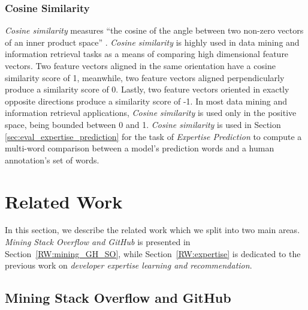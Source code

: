         \subsubsection{Cosine Similarity}
            \emph{Cosine similarity} measures ``the cosine of the angle between two non-zero vectors of an inner product space'' \cite{cosSim_def}. \emph{Cosine similarity} is highly used in data mining and information retrieval tasks as a means of comparing high dimensional feature vectors. Two feature vectors aligned in the same orientation have a cosine similarity score of 1, meanwhile, two feature vectors aligned perpendicularly produce a similarity score of 0. Lastly, two feature vectors oriented in exactly opposite directions produce a similarity score of -1. In most data mining and information retrieval applications, \emph{Cosine similarity} is used only in the positive space, being bounded between 0 and 1. \emph{Cosine similarity} is used in Section \ref{sec:eval_expertise_prediction} for the task of \emph{Expertise Prediction} to compute a multi-word comparison between a model's prediction words and a human annotation's set of words.
            

\section{Related Work}\label{sec:relatedWork}

    In this section, we describe the related work which we split into two main areas. \emph{Mining Stack Overflow and GitHub} is presented in Section~\ref{RW:mining_GH_SO}, while Section~\ref{RW:expertise} is dedicated to the previous work on \emph{developer expertise learning and recommendation}. 
    
    \subsection{Mining Stack Overflow and GitHub\label{RW:mining_GH_SO}}
    
